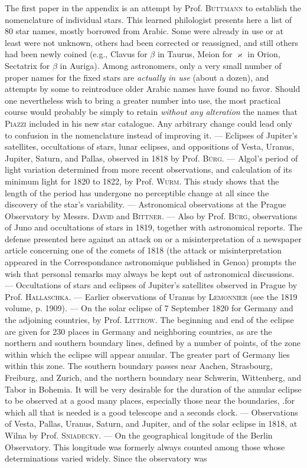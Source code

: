 \begingroup{}\relax
The first paper in the appendix is an attempt by Prof. \textsc{Buttmann} to establish the nomenclature of individual stars. This learned philologist presents here a list of 80 star names, mostly borrowed from Arabic. Some were already in use or at least were not unknown, others had been corrected or reassigned, and still others had been newly coined (e.g., Clavus for $\beta$ in Taurus, Meion for $\varkappa$ in Orion, 
Sectatrix for $\beta$ in Auriga). Among astronomers, only a very small number of proper names for the fixed stars are \emph{actually in use} (about a dozen), and attempts by some to reintroduce older Arabic names have found no favor. Should one nevertheless wish to bring a greater number into use, the most practical course would probably be simply to retain \emph{without any alteration} the names that \textsc{Piazzi} included in his new star catalogue. Any arbitrary change could lead only to confusion in the nomenclature instead of improving it. --- Eclipses of Jupiter's satellites, occultations of stars, lunar eclipses, and oppositions of Vesta, Uranus, Jupiter, Saturn, and Pallas, observed in 1818 by Prof. \textsc{Bürg}. --- Algol's period of light variation determined from more recent observations, and calculation of its minimum light for 1820 to 1822, by Prof. \textsc{Wurm}. This study shows that the length of the period has undergone no perceptible change at all since the discovery of the star's variability. --- Astronomical observations at the Prague Observatory by Messrs. \textsc{David} and \textsc{Bittner}. --- Also by Prof. \textsc{Bürg}, observations of Juno and occultations of stars in 1819, together with astronomical reports. The defense presented here against an attack on or a misinterpretation of a newspaper article concerning one of the comets of 1818 (the attack or misinterpretation appeared in the Correspondance astronomique published in Genoa) prompts the wish that personal remarks may always be kept out of astronomical discussions. --- Occultations of stars and eclipses of Jupiter's satellites observed in Prague by Prof. \textsc{Hallaschka}. --- Earlier observations of Uranus by \textsc{Lemonnier} (see the 1819 volume, p. 1909). --- On the solar eclipse of 7 September 1820 for Germany and the adjoining countries, by Prof. \textsc{Littrow}. The beginning and end of the eclipse are given for 230 places in Germany and neighboring countries, as are the northern and southern boundary lines, defined by a number of points, of the zone within which the eclipse will appear annular. The greater part of Germany lies within this zone. The southern boundary passes near Aachen, Strasbourg, Freiburg, and Zurich, and the northern boundary near Schwerin, Wittenberg, and Tabor in Bohemia. It will be very desirable for the duration of the annular eclipse to be observed at a good many places, especially those near the boundaries, .for which all that is needed is a good telescope and a seconds clock. --- Observations of Vesta, Pallas, Uranus, Saturn, and Jupiter, and of the solar eclipse in 1818, at Wilna by Prof. \textsc{Sniadecky}. --- On the geographical longitude of the Berlin Observatory. This longitude was formerly always counted among those whose determinations varied widely. Since the observatory was 